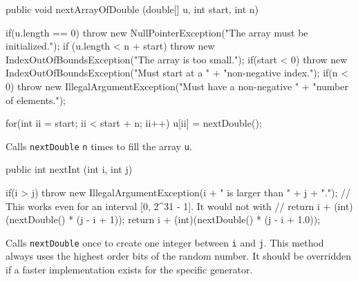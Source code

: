 \begin{htmlonly}
\end{htmlonly}
\begin{code}

   public void nextArrayOfDouble (double[] u, int start, int n) \begin{hide} {
      if(u.length == 0)
         throw new NullPointerException("The array must be initialized.");
      if (u.length < n + start)
         throw new IndexOutOfBoundsException("The array is too small.");
      if(start < 0)
         throw new IndexOutOfBoundsException("Must start at a " +
                                             "non-negative index.");
      if(n < 0)
         throw new IllegalArgumentException("Must have a non-negative " +
                                            "number of elements.");

      for(int ii = start; ii < start + n; ii++)
         u[ii] = nextDouble();
   }\end{hide}
\end{code} 
\begin{tabb} Calls \texttt{nextDouble} \texttt{n} times to fill the array \texttt{u}.
\end{tabb}
\begin{htmlonly}
\end{htmlonly}
\begin{code}
  
   public int nextInt (int i, int j) \begin{hide} {
      if(i > j)
         throw new IllegalArgumentException(i + " is larger than " +
                                            j + ".");
      // This works even for an interval [0, 2^31 - 1]. It would not with 
      // return i + (int)(nextDouble() * (j - i + 1));
      return i + (int)(nextDouble() * (j - i + 1.0));
   } \end{hide}
\end{code} 
\begin{tabb} Calls \texttt{nextDouble} once to create one integer between
  \texttt{i} and \texttt{j}. This method always uses the highest order bits
  of the random number. It should be overridden if a faster implementation 
  exists for the specific generator.
\end{tabb}
\begin{htmlonly}
\end{htmlonly}
